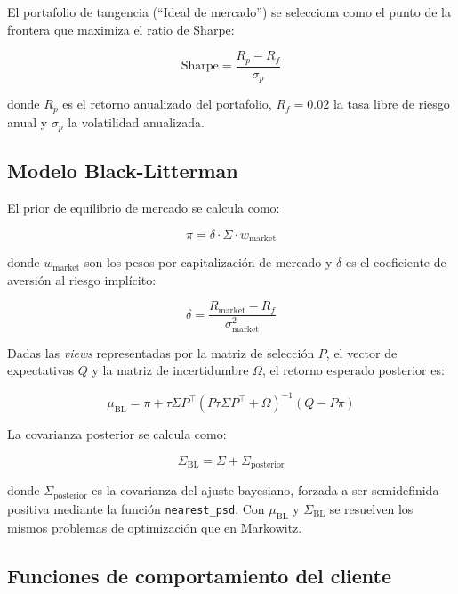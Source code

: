 El portafolio de tangencia (``Ideal de mercado'') se selecciona como el punto de la frontera que maximiza el ratio de Sharpe:
 
\begin{equation}
\text{Sharpe} = \frac{R_p - R_f}{\sigma_p}
\end{equation}
 
donde $R_p$ es el retorno anualizado del portafolio, $R_f = 0.02$ la tasa libre de riesgo anual y $\sigma_p$ la volatilidad anualizada.
 
\subsection{Modelo Black-Litterman}
 
El prior de equilibrio de mercado se calcula como:
 
\begin{equation}
\pi = \delta \cdot \Sigma \cdot w_{\text{market}}
\end{equation}
 
donde $w_{\text{market}}$ son los pesos por capitalizaci\'on de mercado y $\delta$ es el coeficiente de aversi\'on al riesgo impl\'icito:
 
\begin{equation}
\delta = \frac{R_{\text{market}} - R_f}{\sigma_{\text{market}}^2}
\end{equation}
 
Dadas las \textit{views} representadas por la matriz de selecci\'on $P$, el vector de expectativas $Q$ y la matriz de incertidumbre $\Omega$, el retorno esperado posterior es:
 
\begin{equation}
\mu_{\text{BL}} = \pi + \tau \Sigma P^\top (P \tau \Sigma P^\top + \Omega)^{-1} (Q - P\pi)
\end{equation}
 
La covarianza posterior se calcula como:
 
\begin{equation}
\Sigma_{\text{BL}} = \Sigma + \Sigma_{\text{posterior}}
\end{equation}
 
donde $\Sigma_{\text{posterior}}$ es la covarianza del ajuste bayesiano, forzada a ser semidefinida positiva mediante la funci\'on \texttt{nearest\_psd}. Con $\mu_{\text{BL}}$ y $\Sigma_{\text{BL}}$ se resuelven los mismos problemas de optimizaci\'on que en Markowitz.
 
\subsection{Funciones de comportamiento del cliente}
 
